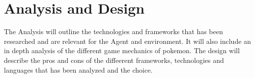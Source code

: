 \chapter{Analysis and Design}
\label{chap:analysis-and-design}




The Analysis will outline the technologies and frameworks that has been researched and 
are relevant for the Agent and environment. It will also include an in depth analysis
of the different game mechanics of pokemon. The design will describe the 
pros and cons of the diffeerent frameworks, technologies and languages that has been
analyzed and the choice.










